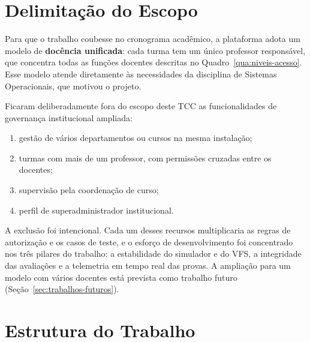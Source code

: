 \section{Delimitação do Escopo}
\label{sec:delimitacao-escopo}

Para que o trabalho coubesse no cronograma acadêmico, a plataforma adota um modelo de \textbf{docência unificada}: cada turma tem um único professor responsável, que concentra todas as funções docentes descritas no Quadro~\ref{qua:niveis-acesso}. Esse modelo atende diretamente às necessidades da disciplina de Sistemas Operacionais, que motivou o projeto.

Ficaram deliberadamente fora do escopo deste TCC as funcionalidades de governança institucional ampliada:
\begin{enumerate}
    \item gestão de vários departamentos ou cursos na mesma instalação;
    \item turmas com mais de um professor, com permissões cruzadas entre os docentes;
    \item supervisão pela coordenação de curso;
    \item perfil de superadministrador institucional.
\end{enumerate}

A exclusão foi intencional. Cada um desses recursos multiplicaria as regras de autorização e os casos de teste, e o esforço de desenvolvimento foi concentrado nos três pilares do trabalho: a estabilidade do simulador e do VFS, a integridade das avaliações e a telemetria em tempo real das provas. A ampliação para um modelo com vários docentes está prevista como trabalho futuro (Seção~\ref{sec:trabalhos-futuros}).

\section{Estrutura do Trabalho}
\label{sec:estrutura}

